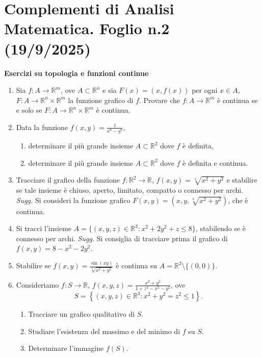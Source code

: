 \section*{Complementi di Analisi Matematica. Foglio n.2 (19/9/2025)}

\textbf{Esercizi su topologia e funzioni continue}

\begin{enumerate}
	\item Sia $f: A \to \mathbb{R}^m$, ove $A \subset \mathbb{R}^n$ e sia $F(x) = (x, f(x))$ per ogni $x \in A$, $F: A \to \mathbb{R}^n \times \mathbb{R}^m$ la funzione grafico di $f$. Provare che $f: A \to \mathbb{R}^m$ è continua se e solo se $F: A \to \mathbb{R}^n \times \mathbb{R}^m$ è continua.
	
	\item Data la funzione $f(x,y) = \frac{1}{x^8 - y^8}$,
	\begin{enumerate}
		\item determinare il più grande insieme $A \subset \mathbb{R}^2$ dove $f$ è definita,
		\item determinare il più grande insieme $A \subset \mathbb{R}^2$ dove $f$ è definita e continua.
	\end{enumerate}
	
	\item Tracciare il grafico della funzione $f: \mathbb{R}^2 \to \mathbb{R}$, $f(x,y) = \sqrt[4]{x^2 + y^2}$ e stabilire se tale insieme è chiuso, aperto, limitato, compatto o connesso per archi.
	\textit{Sugg.} Si consideri la funzione grafico $F(x,y) = \left(x, y, \sqrt[4]{x^2 + y^2}\right)$, che è continua.
	
	\item Si tracci l'insieme $A = \{(x,y,z) \in \mathbb{R}^3 : x^2 + 2y^2 + z \leq 8\}$, stabilendo se è connesso per archi.
	\textit{Sugg.} Si consiglia di tracciare prima il grafico di $f(x,y) = 8 - x^2 - 2y^2$.
	
	\item Stabilire se $f(x,y) = \frac{\sin(xy)}{\sqrt[3]{x^2 + y^2}}$ è continua su $A = \mathbb{R}^2 \setminus \{(0,0)\}$.
	
	\item Consideriamo $f: S \to \mathbb{R}$, $f(x,y,z) = \frac{x^2 + y^2}{1 + z^2 - x^2 - y^2}$, ove
	\[
	S = \left\{(x,y,z) \in \mathbb{R}^3 : x^2 + y^2 = z^2 \leq 1\right\}.
	\]
	\begin{enumerate}
		\item Tracciare un grafico qualitativo di $S$.
		\item Studiare l'esistenza del massimo e del minimo di $f$ su $S$.
		\item Determinare l'immagine $f(S)$.
	\end{enumerate}
	

\end{enumerate}
